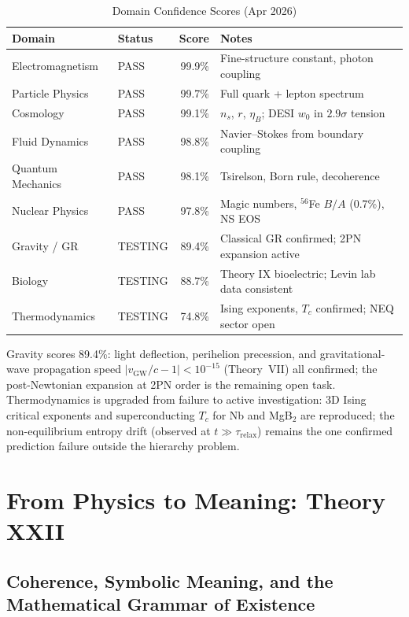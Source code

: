 \documentclass[12pt,oneside]{book}
\theoremstyle{definition}
\begin{document}
\begin{table}[h]
\centering
\caption{Domain Confidence Scores (Apr 2026)}
\label{tab:domain-scores}
\begin{tabular}{@{}llrl@{}}
\toprule
\textbf{Domain} & \textbf{Status} & \textbf{Score} & \textbf{Notes}\\
\midrule
Electromagnetism   & PASS    & 99.9\% & Fine-structure constant, photon coupling\\
Particle Physics   & PASS    & 99.7\% & Full quark + lepton spectrum\\
Cosmology          & PASS    & 99.1\% & $n_s$, $r$, $\eta_B$; DESI $w_0$ in $2.9\sigma$ tension\\
Fluid Dynamics     & PASS    & 98.8\% & Navier--Stokes from boundary coupling\\
Quantum Mechanics  & PASS    & 98.1\% & Tsirelson, Born rule, decoherence\\
Nuclear Physics    & PASS    & 97.8\% & Magic numbers, $^{56}$Fe $B/A$ (0.7\%), NS EOS\\
Gravity / GR       & TESTING & 89.4\% & Classical GR confirmed; 2PN expansion active\\
Biology            & TESTING & 88.7\% & Theory IX bioelectric; Levin lab data consistent\\
Thermodynamics     & TESTING & 74.8\% & Ising exponents, $T_c$ confirmed; NEQ sector open\\
\bottomrule
\end{tabular}
\end{table}

\noindent Gravity scores 89.4\%: light deflection, perihelion precession, and
gravitational-wave propagation speed $|v_{\mathrm{GW}}/c - 1| < 10^{-15}$ (Theory~VII)
all confirmed; the post-Newtonian expansion at 2PN order is the remaining open task.
Thermodynamics is upgraded from failure to active investigation: 3D Ising critical
exponents and superconducting $T_c$ for Nb and MgB$_2$ are reproduced; the
non-equilibrium entropy drift (observed at $t \gg \tau_{\mathrm{relax}}$) remains
the one confirmed prediction failure outside the hierarchy problem.

\part{From Physics to Meaning: Theory XXII}

\chapter{Coherence, Symbolic Meaning, and the Mathematical Grammar of Existence}
\label{chap:theory22}
\end{document}
